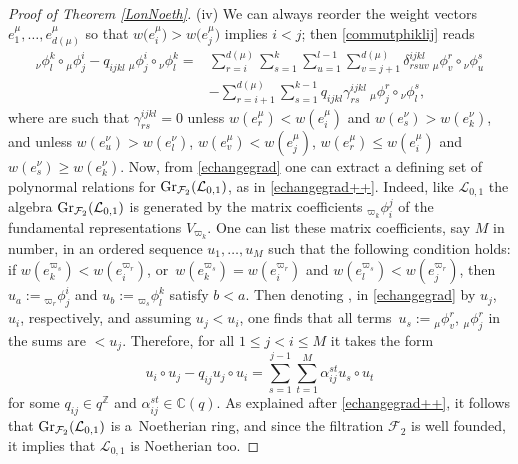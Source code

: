 \documentclass[10pt,a4paper]{amsart}
\numberwithin{equation}{section}
\theoremstyle{definition}
\newcommand{\mc}{\mathbb{C}}
\newcommand{\mz}{\mathbb{Z}}
\newcommand{\Ll}{{\mathcal L}}
\begin{document}
\begin{proof}[Proof of Theorem \ref{LonNoeth}]
(iv) We can always reorder the weight vectors $e_1^\mu,\dots,e_{d(\mu)}^\mu$ so that $w\big(e_i^\mu\big) > w\big(e_j^\mu\big)$ implies $i < j$; then \eqref{commutphiklij} reads
\begin{align}
{}_{{\nu}}\phi^k_l \circ {}_{{\mu}}\phi^i_j - q_{ijkl} \ {}_{{\mu}}\phi^i_j\circ {}_{{\nu}}\phi^k_l ={}& \sum_{r=i}^{d(\mu)}\sum_{s=1}^k \sum_{u=1}^{l-1} \sum_{v=j+1}^{d(\mu)} \delta^{ijkl}_{rsuv} \ {}_{\mu}\phi^r_v \circ {}_{{\nu}}\phi^s_u \nonumber\\
 & - \sum_{r=i+1}^{d(\mu)}\sum_{s=1}^{k-1} q_{ijkl}\gamma_{rs}^{ijkl} \ {}_{\mu}\phi^r_j \circ {}_{{\nu}}\phi^s_l, \label{echangegrad}
\end{align}
where \smash{$\gamma_{rs}^{ijkl}, \delta^{ijkl}_{rsuv}\in \mc(q)$} are such that $\gamma_{rs}^{ijkl}=0$ unless $w(e_r^\mu) < w(e_i^\mu)$ and $w(e_s^\nu) > w(e_k^\nu)$, and  unless $w(e_u^\nu) > w(e_l^\nu)$, $w(e_v^\mu) < w(e_j^\mu)$, $w(e_r^\mu) \leq w(e_i^\mu)$ and $w(e_s^\nu) \geq w(e_k^\nu)$. Now, from \eqref{echangegrad} one can extract a defining set of polynormal relations for $ {\rm Gr}_{{\mathcal F}_2}({\mathcal L}_{0,1})$, as in \eqref{echangegrad++}. Indeed, like ${\mathcal L}_{0,1}$ the algebra $ {\rm Gr}_{{\mathcal F}_2}({\mathcal L}_{0,1})$ is generated by the matrix coefficients ${}_{{\varpi_k}} \phi_i^j$ of the fundamental representations $V_{\varpi_k}$. One can list these matrix coefficients, say $M$ in number, in an ordered sequence $u_1,\dots,u_M$ such that the following condition holds: if $w(e_k^{\varpi_s}) < w(e_i^{\varpi_r})$, or~${w(e_k^{\varpi_s}) = w(e_i^{\varpi_r})}$ and $w(e_l^{\varpi_s}) < w(e_j^{\varpi_r})$, then $u_a:={}_{{\varpi_r}} \phi^i_j$ and $u_b:={}_{{\varpi_s}} \phi^k_l$ satisfy $b<a$. Then denoting ,  in \eqref{echangegrad} by $u_j$, $u_i$, respectively, and assuming $u_j<u_i$, one finds that all terms~${u_s:= {}_{\mu}\phi^r_v}$, ${}_{\mu}\phi^r_j$ in the sums are $< u_j$. Therefore, for all $1\leq j<i\leq M$ it takes the form
\begin{equation}\label{echangegrad+}
u_i\circ u_j - q_{ij} u_j\circ u_i = \sum_{s=1}^{j-1}\sum_{t=1}^M \alpha_{ij}^{st} u_s\circ u_t
\end{equation}
for some $q_{ij}\in q^{\mz}$ and $\alpha_{ij}^{st}\in \mc(q)$. As explained after \eqref{echangegrad++}, it follows that $ {\rm Gr}_{{\mathcal F}_2}({\mathcal L}_{0,1})$ is a~Noetherian ring, and since the filtration $\mathcal{F}_2$ is well founded, it implies that $\Ll_{0,1}$ is Noetherian too.


\end{proof}
\end{document}
